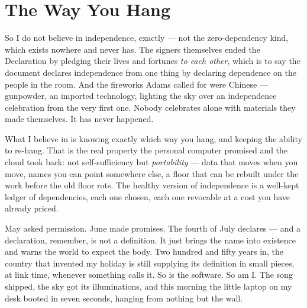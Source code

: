 \documentclass[11pt,letterpaper]{article}
\begin{document}
\section{The Way You Hang}

So I do not believe in independence, exactly --- not the zero-dependency kind, which exists nowhere and never has. The signers themselves ended the Declaration by pledging their lives and fortunes \textit{to each other}, which is to say the document declares independence from one thing by declaring dependence on the people in the room. And the fireworks Adams called for were Chinese --- gunpowder, an imported technology, lighting the sky over an independence celebration from the very first one. Nobody celebrates alone with materials they made themselves. It has never happened.

What I believe in is knowing exactly which way you hang, and keeping the ability to re-hang. That is the real property the personal computer promised and the cloud took back: not self-sufficiency but \textit{portability} --- data that moves when you move, names you can point somewhere else, a floor that can be rebuilt under the work before the old floor rots. The healthy version of independence is a well-kept ledger of dependencies, each one chosen, each one revocable at a cost you have already priced.

May asked permission. June made promises. The fourth of July declares --- and a declaration, remember, is not a definition. It just brings the name into existence and warns the world to expect the body. Two hundred and fifty years in, the country that invented my holiday is still supplying its definition in small pieces, at link time, whenever something calls it. So is the software. So am I. The song shipped, the sky got its illuminations, and this morning the little laptop on my desk booted in seven seconds, hanging from nothing but the wall.

\end{document}
